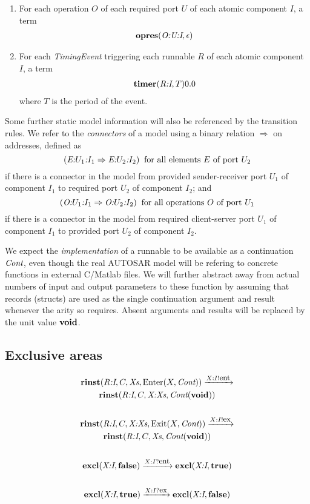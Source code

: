 \documentclass[twocolumn]{article}
\begin{document}
\begin{enumerate}
\item For each operation $O$ of each required port $U$ of each atomic component $I$, a term
$$
\begin{array}{c}
	\textbf{opres}(\emph{O:U:I},\epsilon)
\end{array}
$$

\item For each \emph{TimingEvent} triggering each runnable $R$ of each atomic component $I$, a term
$$
\begin{array}{c}
	\textbf{timer}(\emph{R:I},T){0.0}
\end{array}
$$
where $T$ is the period of the event.

\end{enumerate}

Some further static model information will also be referenced by the transition rules. We refer to the \emph{connectors} of a model using a binary relation $\Rightarrow$ on addresses, defined as
$$
	(\emph{E:$U_1$:$I_1$} \Rightarrow \emph{E:$U_2$:$I_2$}) \;\;\text{for all elements $E$ of port $U_2$}
$$
if there is a connector in the model from provided sender-receiver port $U_1$ of component $I_1$ to required port $U_2$ of component $I_2$; and
$$
	(\emph{O:$U_1$:$I_1$} \Rightarrow \emph{O:$U_2$:$I_2$}) \;\;\text{for all operations $O$ of port $U_1$}
$$
if there is a connector in the model from required client-server port $U_1$ of component $I_1$ to provided port $U_2$ of component $I_2$.

We expect the \emph{implementation} of a runnable to be available as a continuation $\text{\it Cont}$, even though the real AUTOSAR model will be refering to concrete functions in external C/Matlab files. We will further abstract away from actual numbers of input and output parameters to these function by assuming that records (structs) are used as the single continuation argument and result whenever the arity so requires. Absent arguments and results will be replaced by the unit value $\textbf{void}$.

\subsection{Exclusive areas}

\begin{gather*}
	\textbf{rinst}(\emph{R:I},C,\text{\it Xs},\text{Enter}(X,\text{\it Cont}))  \xrightarrow{X:I ! \text{\small ent}}  \\
		\textbf{rinst}(\emph{R:I},C,\emph{X:Xs},\text{\it Cont}(\textbf{void})) \\
	\\
	\textbf{rinst}(\emph{R:I},C,\emph{X:Xs},\text{Exit}(X,\text{\it Cont}))  \xrightarrow{X:I ! \text{\small ex}}  \\
		\textbf{rinst}(\emph{R:I},C,\text{\it Xs},\text{\it Cont}(\textbf{void})) \\
	\\
	\textbf{excl}(\emph{X:I},\textbf{false}) \xrightarrow{X:I ? \text{\small ent}} \textbf{excl}(\emph{X:I},\textbf{true}) \\
	\\
	\textbf{excl}(\emph{X:I},\textbf{true}) \xrightarrow{X:I ? \text{\small ex}} \textbf{excl}(\emph{X:I},\textbf{false}) \\
	\\
\end{gather*}
\end{document}
